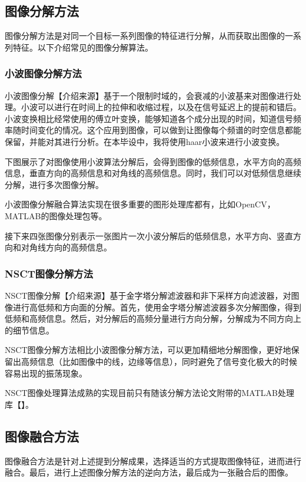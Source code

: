 \documentclass{xduugthesis}
\begin{document}
\subsection{图像分解方法}
图像分解方法是对同一个目标一系列图像的特征进行分解，从而获取出图像的一系列特征。以下介绍常见的图像分解算法。\par
\subsubsection{小波图像分解方法}
小波图像分解【介绍来源】基于一个限制时域的，会衰减的小波基来对图像进行处理。小波可以进行在时间上的拉伸和收缩过程，以及在信号延迟上的提前和错后。小波变换相比经常使用的傅立叶变换，能够知道各个成分出现的时间，知道信号频率随时间变化的情况。这个应用到图像，可以做到让图像每个频谱的时空信息都能保留，并能对其进行分析。在本毕设中，我将使用haar小波来进行小波变换。\par
下图展示了对图像使用小波算法分解后，会得到图像的低频信息，水平方向的高频信息，垂直方向的高频信息和对角线的高频信息。同时，我们可以对低频信息继续分解，进行多次图像分解。\par
小波图像分解融合算法实现在很多重要的图形处理库都有，比如OpenCV，MATLAB的图像处理包等。\par

接下来四张图像分别表示一张图片一次小波分解后的低频信息，水平方向、竖直方向和对角线方向的高频信息。\par

\subsubsection{NSCT图像分解方法}
NSCT图像分解【介绍来源】基于金字塔分解滤波器和非下采样方向滤波器，对图像进行高低频和方向面的分解。首先，使用金字塔分解滤波器多次分解图像，得到低频和高频信息。然后，对分解后的高频分量进行方向分解，分解成为不同方向上的细节信息。\par

NSCT图像分解方法相比小波图像分解方法，可以更加精细地分解图像，更好地保留出高频信息（比如图像中的线，边缘等信息），同时避免了信号变化极大的时候容易出现的振荡现象。\par
NSCT图像处理算法成熟的实现目前只有随该分解方法论文附带的MATLAB处理库【】。\par

\subsection{图像融合方法}
图像融合方法是针对上述提到分解成果，选择适当的方式提取图像特征，进而进行融合。最后，进行上述图像分解方法的逆向方法，最后成为一张融合后的图像。\par
\end{document}
